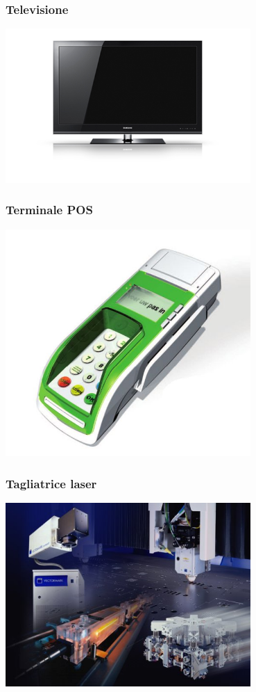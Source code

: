 \documentclass[xetex]{beamer}
\begin{document}
\begin{frame}
\frametitle{Televisione}
  \begin{center}
    \includegraphics[width=0.7\textwidth]{images/television.jpg}
  \end{center}
\end{frame}

\begin{frame}
\frametitle{Terminale POS}
  \begin{center}
    \includegraphics[width=0.7\textwidth]{images/point-of-sale.jpg}
  \end{center}
\end{frame}

\begin{frame}
\frametitle{Tagliatrice laser}
  \begin{center}
    \includegraphics[width=0.7\textwidth]{images/laser-cutting-machine.jpg}
  \end{center}
\end{frame}
\end{document}
